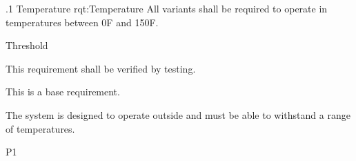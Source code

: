 

\ONERQMTVKSA
{\RqtNumberBase.1}
{Temperature}
{rqt:Temperature}
{All \ThisSystem variants shall be required to operate in temperatures between 0\degree F and 150\degree F.}
{
	\item [Phase 1] Threshold
}
{This requirement shall be verified by testing.}
{
\item [N/A] This is a base requirement.
}
{
	\item The system is designed to operate outside and must be able to withstand a range of temperatures.
}
{P1}
